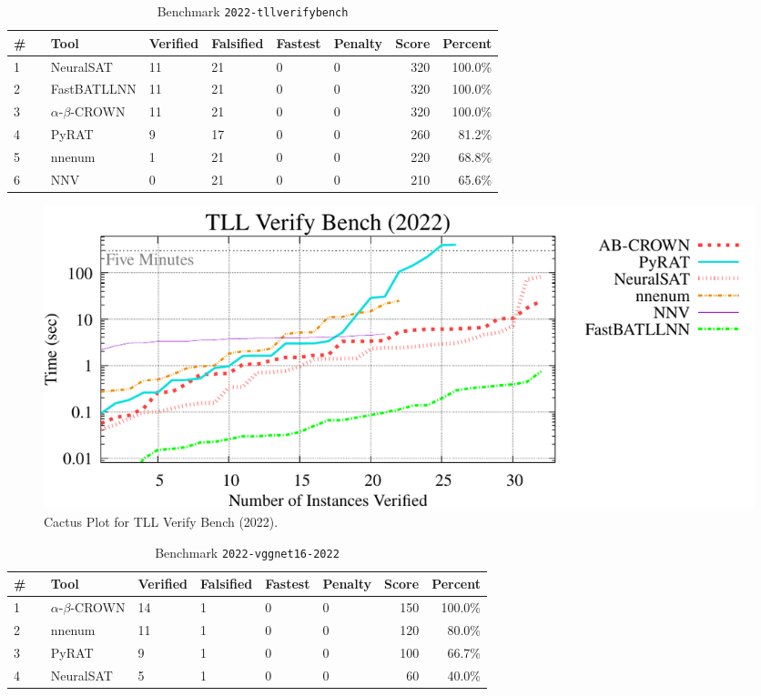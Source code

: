 \begin{table}[h]
\begin{center}
\caption{Benchmark \texttt{2022-tllverifybench}} \label{tab:cat_{cat}}
{\setlength{\tabcolsep}{2pt}
\begin{tabular}[h]{@{}llllllrr@{}}
\toprule
\textbf{\# ~} & \textbf{Tool} & \textbf{Verified} & \textbf{Falsified} & \textbf{Fastest} & \textbf{Penalty} & \textbf{Score} & \textbf{Percent}\\
\midrule
1 & NeuralSAT & 11 & 21 & 0 & 0 & 320 & 100.0\% \\
2 & FastBATLLNN & 11 & 21 & 0 & 0 & 320 & 100.0\% \\
3 & $\alpha$-$\beta$-CROWN & 11 & 21 & 0 & 0 & 320 & 100.0\% \\
4 & PyRAT & 9 & 17 & 0 & 0 & 260 & 81.2\% \\
5 & nnenum & 1 & 21 & 0 & 0 & 220 & 68.8\% \\
6 & NNV & 0 & 21 & 0 & 0 & 210 & 65.6\% \\
\bottomrule
\end{tabular}
}
\end{center}
\end{table}



\begin{figure}[h]
\centerline{\includegraphics[width=\textwidth]{cactus/2022_tllverifybench.pdf}}
\caption{Cactus Plot for TLL Verify Bench (2022).}
\label{fig:quantPic}
\end{figure}



\begin{table}[h]
\begin{center}
\caption{Benchmark \texttt{2022-vggnet16-2022}} \label{tab:cat_{cat}}
{\setlength{\tabcolsep}{2pt}
\begin{tabular}[h]{@{}llllllrr@{}}
\toprule
\textbf{\# ~} & \textbf{Tool} & \textbf{Verified} & \textbf{Falsified} & \textbf{Fastest} & \textbf{Penalty} & \textbf{Score} & \textbf{Percent}\\
\midrule
1 & $\alpha$-$\beta$-CROWN & 14 & 1 & 0 & 0 & 150 & 100.0\% \\
2 & nnenum & 11 & 1 & 0 & 0 & 120 & 80.0\% \\
3 & PyRAT & 9 & 1 & 0 & 0 & 100 & 66.7\% \\
4 & NeuralSAT & 5 & 1 & 0 & 0 & 60 & 40.0\% \\
\bottomrule
\end{tabular}
}
\end{center}
\end{table}



